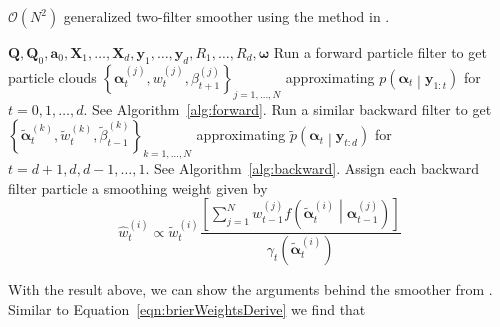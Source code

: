 \documentclass[notitlepage]{article}
\newcommand\StateXX{\Statex\hspace{\algorithmicindent}\hspace{\algorithmicindent}}
\renewcommand{\vec}[1]{\bm{#1}}
\newcommand{\mat}[1]{\mathbf{#1}}
\newcommand{\Lbrac}[1]{\left[ #1\right]}
\newcommand{\Lbrace}[1]{\left\{ #1\right\}}
\newcommand{\Lparen}[1]{\left( #1\right)}
\newcommand{\Cond}[2]{ #1 \middle\vert  #2}
\newcommand{\optor}[2]{#1\Lparen{#2}}
\newcommand{\optorC}[3]{\optor{#1}{\Cond{#2}{#3}}}
\newcommand{\pdensC}[2]{\optorC{p}{#1}{#2}}
\newcommand{\pdenstC}[2]{\optorC{\widetilde p}{#1}{#2}}
\newcommand{\partic}[3]{#1_{#2}^{\Lparen{#3}}}
\newcommand{\particB}[3]{\widetilde{#1}_{#2}^{\Lparen{#3}}}
\newcommand{\particS}[3]{\widehat{#1}_{#2}^{\Lparen{#3}}}
\newcommand{\bigO}[1]{\mathcal{O}\Lparen{#1}}
\newcommand{\nPart}{N}
\newcommand{\nPeriods}{d}
\begin{document}
\begin{algorithm}[H]
\caption{$\bigO{\nPart^2}$ generalized two-filter smoother using the method in \citet{briers09}.}\label{alg:ON2smoother}
\begin{algorithmic}[1]\raggedright
\INPUT
\Statex $\mat{Q},\mat{Q}_0,\vec{a}_0,\mat{X}_1,\dots,\mat{X}_d,\vec{y}_1,\dots,\vec{y}_d,R_1,\dots,R_d,\vec{\omega}$
%
\State Run a forward particle filter to get particle clouds %
	$\Lbrace{\partic{\vec{\alpha}}{t}{j}, \partic{w}{t}{j}, \partic{\beta}{t + 1}{j}}_{j=1,\dots,N}$ %
	approximating $\pdensC{\vec{\alpha}_t}{\vec{y}_{1:t}}$ for $t = 0, 1, \dots, \nPeriods$. See Algorithm~\ref{alg:forward}.
\EndProcedure
%
\State Run a similar backward filter to get %
	$\Lbrace{\particB{\vec{\alpha}}{t}{k}, \particB{w}{t}{k}, \particB{\beta}{t - 1}{k}}_{k=1,\dots,N}$  %
	approximating $\pdenstC{\vec{\alpha}_t}{\vec{y}_{t:\nPeriods}}$ for $t = \nPeriods + 1, \nPeriods, \nPeriods-1, \dots, 1$. See Algorithm~\ref{alg:backward}.
\EndProcedure
%
\For{$t=1,\dots, \nPeriods$}
\State Assign each backward filter particle a smoothing weight given by
\StateXX \begin{equation}\label{eqn:combineWeightO2}
\particS{w}{t}{i} \propto
	\particB{w}{t}{i} \frac{\Lbrac{
		\sum_{j = 1}^\nPart \partic{w}{t - 1}{j}
		\optorC{f}{\particB{\vec{\alpha}}{t}{i}}{\partic{\vec{\alpha}}{t - 1}{j}}
	}}{ \optor{\gamma_t}{\particB{\vec{\alpha}}{t}{i}}}
\end{equation}
\EndFor
\EndProcedure
\end{algorithmic}
\end{algorithm}

With the result above, we can show the arguments behind the 
smoother from \cite{fearnhead10}. Similar to Equation~\eqref{eqn:brierWeightsDerive} we find that 
\end{document}
